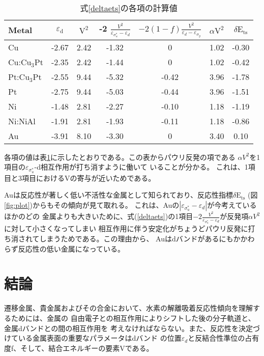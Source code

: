 \documentclass[12pt]{ltjsarticle}
\begin{document}
\begin{table}[htb]
  \begin{center}
    \caption{式\ref{deltaets}の各項の計算値}
    \begin{tabular}{l|cccccc} \hline
    \label{table}
      Metal & $\varepsilon_\text{d}$ & $\text{V}^\text{2}$ & -2 $\frac{ V^2 }{\varepsilon _{\sigma_u^*}- \varepsilon _d}$ & $-2(1-f)\frac{V^2}{\varepsilon _d - \varepsilon _{\sigma_g}} $ & $\alpha \text{V}^\text{2}$ & $\delta \text{E}_\text{ts}$ \\ \hline
      Cu                        & -2.67 & 2.42 & -1.32 & 0     & 1.02 & -0.30 \\
      Cu:$\text{Cu}_\text{3}$Pt & -2.35 & 2.42 & -1.44 & 0     & 1.02 & -0.42 \\
      Pt:$\text{Cu}_\text{3}$Pt & -2.55 & 9.44 & -5.32 & -0.42 & 3.96 & -1.78 \\
      Pt                        & -2.75 & 9.44 & -5.03 & -0.44 & 3.96 & -1.51 \\
      Ni                        & -1.48 & 2.81 & -2.27 & -0.10 & 1.18 & -1.19 \\ 
      Ni:NiAl                   & -1.91 & 2.81 & -1.93 & -0.11 & 1.18 & -0.86 \\
      Au                        & -3.91 & 8.10 & -3.30 & 0     & 3.40 & 0.10  \\ \hline
    \end{tabular}
  \end{center}
\end{table}

各項の値は表\ref{table}に示したとおりである。この表からパウリ反発の項である
$\alpha V^2$を1項目の$\varepsilon _{\sigma_u^*}$-d相互作用が打ち消すように働いて
いることが分かる。
これは、1項目と3項目におけるVの寄与が近いためである。

Auは反応性が著しく低い不活性な金属として知られており、反応性指標$\delta \text{E}_\text{ts}$
(図\ref{fig:plot})からもその傾向が見て取れる。
これは、Auの$| \varepsilon _{\sigma_u^*} - \varepsilon _d|$が今考えているほかのどの
金属よりも大きいために、式(\ref{deltaets})の1項目$-2 \frac{ V^2 }{\varepsilon _
{\sigma_u^*} - \varepsilon _d}$が反発項$\alpha V^2$に対して小さくなってしまい
相互作用に伴う安定化がちょうどパウリ反発に打ち消されてしまうためである。この理由から、
Auはdバンドがあるにもかかわらず反応性の低い金属になっている。

\section{結論}
遷移金属、貴金属およびその合金において、水素の解離吸着反応性傾向を理解するためには、金属の
自由電子との相互作用によりシフトした後の分子軌道と、金属dバンドとの間の相互作用を
考えなければならない。また、反応性を決定づけている金属表面の重要なパラメータはdバンド
の位置$\varepsilon_d$と反結合性準位の占有度f、そして、結合エネルギーの要素Vである。



\end{document}
